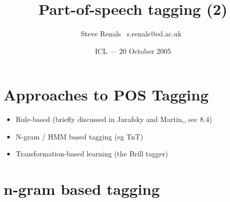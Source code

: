 \usepackage{amsmath}
\usepackage{color}
\title{Part-of-speech tagging (2)}
\author{Steve Renals \newline \mbox{ }s.renals@ed.ac.uk\mbox{ }}
\date{ICL --- 20 October 2005}






\frame{\titlepage}




\frame{\tableofcontents}

\section{Approaches to POS Tagging}

\begin{frame}
  \begin{itemize}
  \item Rule-based (briefly discussed in Jurafsky and Martin,, sec
    8.4)
  \item N-gram / HMM based tagging (eg TnT)
  \item Transformation-based learning (the Brill tagger)
  \end{itemize}
\end{frame}

\section{n-gram based tagging}

